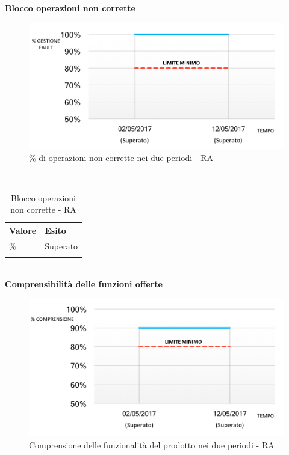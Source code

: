 \documentclass[../PianoDiQualifica_v4.0.0.tex]{subfiles}
\begin{document}
\newpage
	\textbf{Blocco operazioni non corrette}
	\begin{figure}[!h]
		\centering
		\includegraphics{grafici/Blocco.png}
		\caption{\% di operazioni non corrette nei due periodi - RA}
		\label{fig:blocco}
	\end{figure}\mbox{}\\

	\begin{longtable}[c] { >{\centering\arraybackslash}p{3cm} >{\centering\arraybackslash}p{3cm} }
		\toprule
				\textbf{Valore} & \textbf{Esito} \\
			\midrule
				100\% & Superato \\
			\bottomrule
		\caption{Blocco operazioni non corrette - RA}
	\end{longtable}\mbox{}\\

	\newpage
	\textbf{Comprensibilità delle funzioni offerte}
	\begin{figure}[!h]
		\centering
		\includegraphics{grafici/Comprensione.png}
		\caption{Comprensione delle funzionalità del prodotto nei due periodi - RA}
		\label{fig:comprensione}
	\end{figure}\mbox{}\\	
\end{document}
